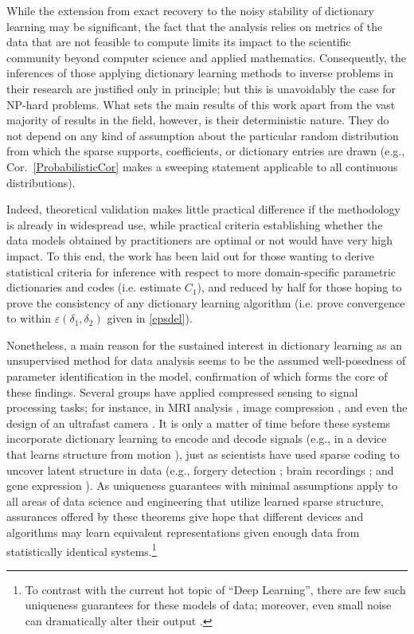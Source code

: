 While the extension from exact recovery to the noisy stability of dictionary learning may be significant, the fact that the analysis relies on metrics of the data that are not feasible to compute limits its impact to the scientific community beyond computer science and applied mathematics. Consequently, the inferences of those applying dictionary learning methods to inverse problems in their research are justified only in principle; but this is unavoidably the case for NP-hard problems. What sets the main results of this work apart from the vast majority of results in the field, however, is their deterministic nature. They do not depend on any kind of assumption about the particular random distribution from which the sparse supports, coefficients, or dictionary entries are drawn (e.g., Cor.~\ref{ProbabilisticCor} makes a sweeping statement applicable to all continuous distributions). 

Indeed, theoretical validation makes little practical difference if the methodology is already in widespread use, while practical criteria establishing whether the data models obtained by practitioners are optimal or not would have very high impact. To this end, the work has been laid out for those wanting to derive statistical criteria for inference with respect to more domain-specific parametric dictionaries and codes (i.e. estimate $C_1$), and reduced by half for those hoping to prove the consistency of any dictionary learning algorithm (i.e. prove convergence to within $\varepsilon(\delta_1,\delta_2)$ given in \eqref{epsdel}). 

Nonetheless, a main reason for the sustained interest in dictionary learning as an unsupervised method for data analysis seems to be the assumed well-posedness of parameter identification in the model, confirmation of which forms the core of these findings. Several groups have applied compressed sensing to signal processing tasks; for instance, in MRI analysis \cite{lustig2008compressed}, image compression \cite{Duarte08}, and even the design of an ultrafast camera \cite{Gao14}. It is only a matter of time before these systems incorporate dictionary learning to encode and decode signals (e.g., in a device that learns structure from motion \cite{kong2016prior}), just as scientists have used sparse coding to %
uncover latent structure in data (e.g., forgery detection \cite{hughes2010, olshausen2010applied}; brain recordings \cite{jung2001imaging, agarwal2014spatially, lee2016sparse}; and gene expression \cite{wu2016stability}). As uniqueness guarantees with minimal assumptions apply to all areas of data science and engineering that utilize learned sparse structure, assurances offered by these theorems give hope that different devices and algorithms may learn equivalent representations given enough data from statistically identical systems.\footnote{To contrast with the current hot topic of ``Deep Learning'', there are few such uniqueness guarantees for these models of data; moreover, even small noise can dramatically alter their output \cite{goodfellow2014explaining}.} 


